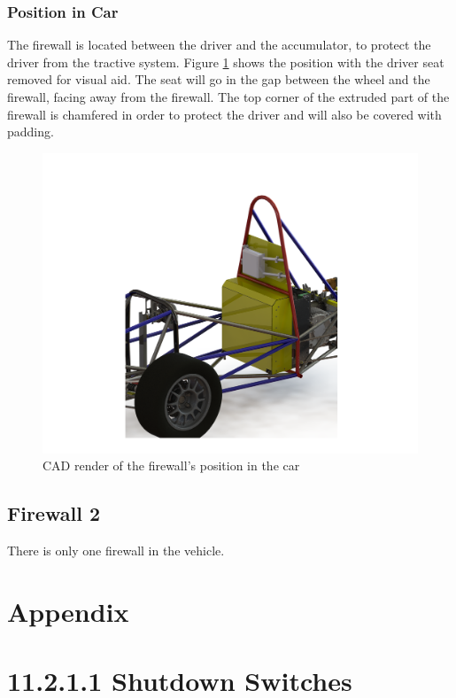 \documentclass{article}
\begin{document}
{        \subsubsection{Position in Car}

            The firewall is located between the driver and the accumulator, to protect the driver from the tractive system. Figure \ref{firewallposition} shows the position with the driver seat removed for visual aid. The seat will go in the gap between the wheel and the firewall, facing away from the firewall. The top corner of the extruded part of the firewall is chamfered in order to protect the driver and will also be covered with padding.

            \begin{figure}[H]
                \centering
                \includegraphics[width = 0.8 \textwidth]{FirewallFullCarView}
                \caption{CAD render of the firewall's position in the car}
                \label{firewallposition}
            \end{figure}

    \subsection{Firewall 2}
        There is only one firewall in the vehicle.

\newpage

\section{Appendix}
\section*{11.2.1.1 Shutdown Switches} \label{shutdownappendix}

}
\end{document}
